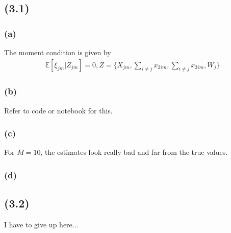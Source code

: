 \documentclass[11pt]{article}
\newcommand{\EE}{\mathbb{E}}
\begin{document}
\subsection*{(3.1)}

\subsubsection*{(a)}

The moment condition is given by
\begin{align*}
    \EE[\xi_{jm} | Z_{jm}] = 0, Z = \{ X_{jm}, \sum_{i \neq j} x_{2im}, \sum_{i \neq j} x_{3im}, W_j\}
\end{align*}

\subsubsection*{(b)}
Refer to code or notebook for this.

\subsubsection*{(c)}
For $M = 10$, the estimates look really bad and far from the true values. 

\subsubsection*{(d)}


\subsection*{(3.2)}

I have to give up here...
\end{document}
